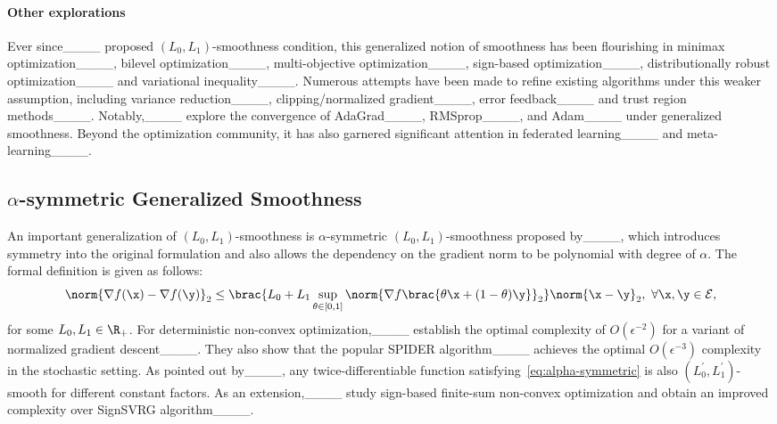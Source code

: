 \paragraph{Other explorations}
Ever since____ proposed $(L_0,L_1)$-smoothness condition, this generalized notion of smoothness has been flourishing in minimax optimization____, bilevel optimization____, multi-objective optimization____, sign-based optimization____, distributionally robust optimization____ and variational inequality____. Numerous attempts have been made to refine existing algorithms under this weaker assumption, including variance reduction____, clipping/normalized gradient____, error feedback____ and trust region methods____. Notably,____ explore the convergence of AdaGrad____, RMSprop____, and Adam____ under generalized smoothness. Beyond the optimization community, it has also garnered significant attention in federated learning____ and meta-learning____.

\subsection{$\alpha$-symmetric Generalized Smoothness}
An important generalization of $(L_0,L_1)$-smoothness is $\alpha$-symmetric $(L_0,L_1)$-smoothness proposed by____, which introduces symmetry into the original formulation and also allows the dependency on the gradient norm to be polynomial with degree of $\alpha$. The formal definition is given as follows:
\begin{equation}
    \norm{\nabla f(\x)-\nabla f(\y)}_2\le\brac{L_0+L_1\sup_{\theta\in[0,1]}\norm{\nabla f\brac{\theta\x+(1-\theta)\y}}_2}\norm{\x-\y}_2,\ \forall\x,\y\in\mathcal{E},\label{eq:alpha-symmetric}
\end{equation}
for some $L_0,L_1\in\R_+$. For deterministic non-convex optimization,____ establish the optimal complexity of $O(\epsilon^{-2})$ for a variant of normalized gradient descent____. They also show that the popular SPIDER algorithm____ achieves the optimal $O(\epsilon^{-3})$ complexity in the stochastic setting. As pointed out by____, any twice-differentiable function satisfying~\eqref{eq:alpha-symmetric} is also $(L_0^{'},L_1^{'})$-smooth for different constant factors. As an extension,____ study sign-based finite-sum non-convex optimization and obtain an improved complexity over SignSVRG algorithm____.

